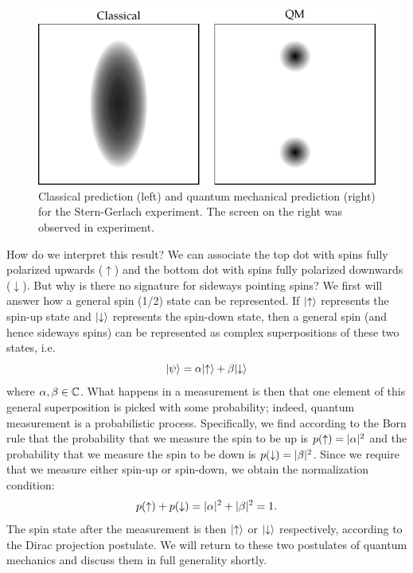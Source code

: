 \begin{figure}[htbp]
    \centering
    \includegraphics[]{Images/fig-SGexppredictions.pdf}
    \caption{Classical prediction (left) and quantum mechanical prediction (right) for the Stern-Gerlach experiment. The screen on the right was observed in experiment.}
    \label{fig-SGexppredictions}
\end{figure}

How do we interpret this result? We can associate the top dot with spins fully polarized upwards ($\uparrow$) and the bottom dot with spins fully polarized downwards ($\downarrow$). But why is there no signature for sideways pointing spins? We first will answer how a general spin (1/2) state can be represented. If $\lvert \uparrow \rangle$ represents the spin-up state and $\lvert \downarrow \rangle$ represents the spin-down state, then a general spin (and hence sideways spins) can be represented as complex superpositions of these two states, i.e.
\begin{equation}
    \lvert \psi \rangle = \alpha\lvert \uparrow \rangle + \beta\lvert \downarrow \rangle
\end{equation}
where $\alpha, \beta \in  \mathbb{C}$. What happens in a measurement is then that one element of this general superposition is picked with some probability; indeed, quantum measurement is a probabilistic process. Specifically, we find according to the Born rule that the probability that we measure the spin to be up is $p(\uparrow) = \lvert \alpha \rvert^2$ and the probability that we measure the spin to be down is $p(\downarrow) = \lvert \beta \rvert^2$. Since we require that we measure either spin-up or spin-down, we obtain the normalization condition:
\begin{equation}
    p(\uparrow) + p(\downarrow) = \lvert \alpha \rvert^2 + \lvert \beta \rvert^2 = 1.
\end{equation}
The spin state after the measurement is then $\lvert \uparrow \rangle$ or $\lvert \downarrow \rangle$ respectively, according to the Dirac projection postulate. We will return to these two postulates of quantum mechanics and discuss them in full generality shortly. 

